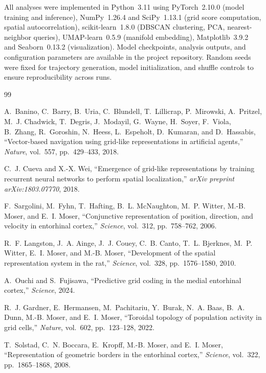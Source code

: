 \documentclass[11pt]{article}
\begin{document}
All analyses were implemented in Python~3.11 using PyTorch~2.10.0 (model training and inference), NumPy~1.26.4 and SciPy~1.13.1 (grid score computation, spatial autocorrelation), scikit-learn~1.8.0 (DBSCAN clustering, PCA, nearest-neighbor queries), UMAP-learn~0.5.9 (manifold embedding), Matplotlib~3.9.2 and Seaborn~0.13.2 (visualization). Model checkpoints, analysis outputs, and configuration parameters are available in the project repository. Random seeds were fixed for trajectory generation, model initialization, and shuffle controls to ensure reproducibility across runs.


\begin{thebibliography}{99}

A.~Banino, C.~Barry, B.~Uria, C.~Blundell, T.~Lillicrap, P.~Mirowski, A.~Pritzel, M.~J. Chadwick, T.~Degris, J.~Modayil, G.~Wayne, H.~Soyer, F.~Viola, B.~Zhang, R.~Goroshin, N.~Heess, L.~Espeholt, D.~Kumaran, and D.~Hassabis,
``Vector-based navigation using grid-like representations in artificial agents,''
\textit{Nature}, vol.~557, pp.~429--433, 2018.

C.~J. Cueva and X.-X. Wei,
``Emergence of grid-like representations by training recurrent neural networks to perform spatial localization,''
\textit{arXiv preprint arXiv:1803.07770}, 2018.

F.~Sargolini, M.~Fyhn, T.~Hafting, B.~L. McNaughton, M.~P. Witter, M.-B. Moser, and E.~I. Moser,
``Conjunctive representation of position, direction, and velocity in entorhinal cortex,''
\textit{Science}, vol.~312, pp.~758--762, 2006.

R.~F. Langston, J.~A. Ainge, J.~J. Couey, C.~B. Canto, T.~L. Bjerknes, M.~P. Witter, E.~I. Moser, and M.-B. Moser,
``Development of the spatial representation system in the rat,''
\textit{Science}, vol.~328, pp.~1576--1580, 2010.

A.~Ouchi and S.~Fujisawa,
``Predictive grid coding in the medial entorhinal cortex,''
\textit{Science}, 2024.

R.~J. Gardner, E.~Hermansen, M.~Pachitariu, Y.~Burak, N.~A. Baas, B.~A. Dunn, M.-B. Moser, and E.~I. Moser,
``Toroidal topology of population activity in grid cells,''
\textit{Nature}, vol.~602, pp.~123--128, 2022.

T.~Solstad, C.~N. Boccara, E.~Kropff, M.-B. Moser, and E.~I. Moser,
``Representation of geometric borders in the entorhinal cortex,''
\textit{Science}, vol.~322, pp.~1865--1868, 2008.


\end{thebibliography}
\end{document}
